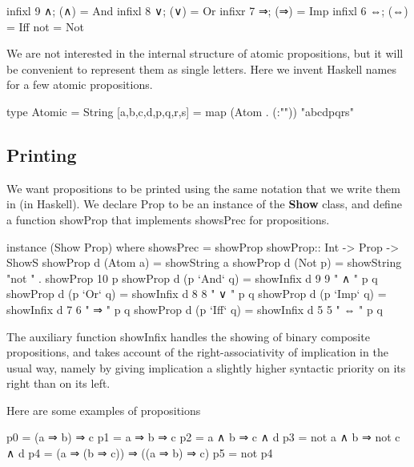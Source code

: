 \documentclass[11pt]{article}
\begin{document}
\begin{code}
  infixl 9 ∧;  (∧)  = And
  infixl 8 ∨;  (∨)  = Or
  infixr 7 ⇒; (⇒)  = Imp
  infixl 6 ⇔; (⇔)  = Iff  
  not = Not
\end{code}

We are not interested in the internal structure of atomic
propositions, but it will be convenient to represent
them as single letters. Here we invent Haskell names for a few atomic
propositions.
\begin{code}
  type Atomic = String
  [a,b,c,d,p,q,r,s] = map (Atom . (:"")) "abcdpqrs"
\end{code}


\subsection{Printing}
We want propositions to be printed using the same notation
that we write them in (in Haskell). We declare \textsf{Prop}
to be an instance of the \textbf{Show} class, and define a
function \textsf{showProp} that implements
\textsf{showsPrec} for propositions.

\begin{code}
  instance (Show Prop) where showsPrec = showProp  
  showProp::  Int -> Prop -> ShowS
  showProp d (Atom a)    = showString a
  showProp d (Not  p)    = showString "not " . showProp 10 p
  showProp d (p `And` q) = showInfix d 9 9 " ∧ "     p q
  showProp d (p `Or` q)  = showInfix d 8 8 " ∨ "     p q
  showProp d (p `Imp` q) = showInfix d 7 6 " ⇒ "    p q
  showProp d (p `Iff` q) = showInfix d 5 5 " ⇔ "    p q
\end{code}

The auxiliary function \textsf{showInfix} handles the
showing of binary composite propositions, and takes account
of the right-associativity of implication in the usual way,
namely by giving implication a slightly higher syntactic
priority on its right than on its left. 


Here are some examples of propositions

\begin{code}
  p0 = (a ⇒ b) ⇒ c
  p1 = a ⇒ b ⇒ c
  p2 = a ∧ b ⇒ c ∧ d
  p3 = not a  ∧  b  ⇒  not c  ∧  d
  p4 = (a ⇒ (b ⇒ c)) ⇒ ((a ⇒ b) ⇒ c)
  p5 = not p4
\end{code}
\end{document}
